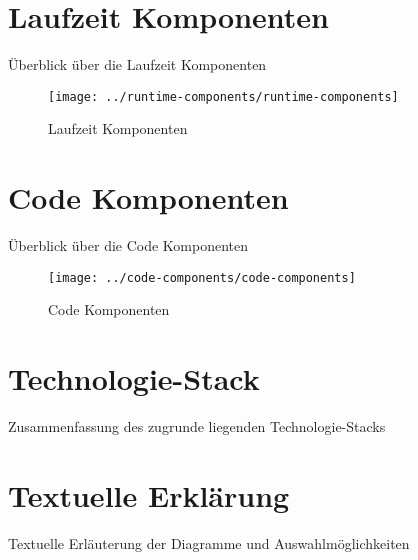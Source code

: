 


\cfoot[]{\pagemark}
\ofoot{\todayGer}

\section{Laufzeit Komponenten}


Überblick über die Laufzeit Komponenten

\vspace*{\fill}

\begin{figure}[ht]
    \centering
    \texttt{[image: ../runtime-components/runtime-components]}
    \caption{Laufzeit Komponenten}
    \label{fig:runtime-components}
\end{figure}

\vspace*{\fill}

\newpage

\section{Code Komponenten}


Überblick über die Code Komponenten

\vspace*{\fill}

\begin{figure}[ht]
    \centering
    \texttt{[image: ../code-components/code-components]}
    \caption{Code Komponenten}
    \label{fig:code-components}
\end{figure}

\vspace*{\fill}

\newpage

\section{Technologie-Stack}


Zusammenfassung des zugrunde liegenden Technologie-Stacks

\newpage

\section{Textuelle Erklärung}


Textuelle Erläuterung der Diagramme und Auswahlmöglichkeiten

